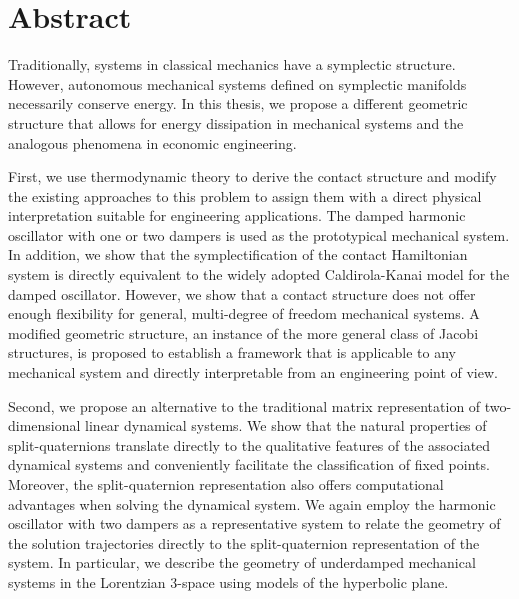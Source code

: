 \chapter*{Abstract}%

Traditionally, systems in classical mechanics have a symplectic structure. 
However, autonomous mechanical systems defined on symplectic manifolds necessarily conserve energy.
In this thesis, we propose a different geometric structure that allows for energy dissipation in mechanical systems and the analogous phenomena in economic engineering. 

First, we use thermodynamic theory to derive the contact structure and modify the existing approaches to this problem to assign them with a direct physical interpretation suitable for engineering applications. 
The damped harmonic oscillator with one or two dampers is used as the prototypical mechanical system. 
In addition, we show that the symplectification of the contact Hamiltonian system is directly equivalent to the widely adopted Caldirola-Kanai model for the damped oscillator.
However, we show that a contact structure does not offer enough flexibility for general, multi-degree of freedom mechanical systems.
A modified geometric structure, an instance of the more general class of Jacobi structures, is proposed to establish a framework that is applicable to any mechanical system and directly interpretable from an engineering point of view.

Second, we propose an alternative to the traditional matrix representation of two-dimensional linear dynamical systems. 
We show that the natural properties of split-quaternions translate directly to the qualitative features of the associated dynamical systems and conveniently facilitate the classification of fixed points. Moreover, the split-quaternion representation also offers computational advantages when solving the dynamical system.
We again employ the harmonic oscillator with two dampers as a representative system to relate the geometry of the solution trajectories directly to the split-quaternion representation of the system. In particular, we describe the geometry of underdamped mechanical systems in the Lorentzian 3-space using models of the hyperbolic plane.

 
